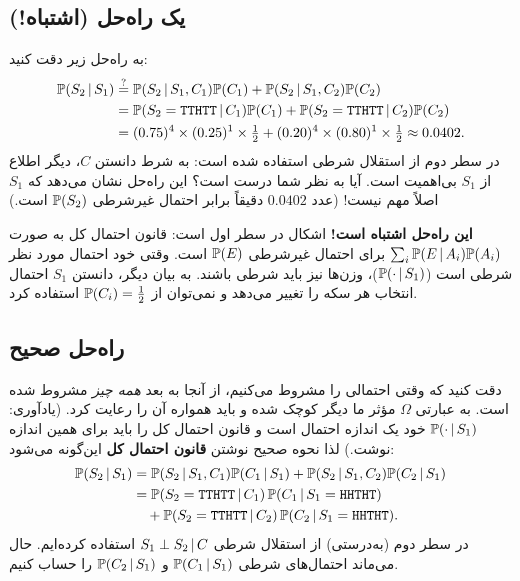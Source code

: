\subsection{یک راه‌حل (اشتباه!)}
به راه‌حل زیر دقت کنید:
\begin{align*}
\mathbb{P}(S_2\,|\, S_1)&\overset{?}{=}\mathbb{P}(S_2\,|\, S_1,C_1)\mathbb{P}(C_1)+\mathbb{P}(S_2\,|\, S_1,C_2)\mathbb{P}(C_2)\\
&=\mathbb{P}(S_2=\mathtt{TTHTT}\,|\, C_1)\mathbb{P}(C_1)+\mathbb{P}(S_2=\mathtt{TTHTT}\,|\, C_2)\mathbb{P}(C_2)\\
&=(0.75)^4\times(0.25)^1\times\tfrac12+(0.20)^4\times(0.80)^1\times\tfrac12\approx0.0402 .
\end{align*}
در سطر دوم از استقلال شرطی استفاده شده است: به شرط دانستن $C$، دیگر اطلاع از $S_1$ بی‌اهمیت است. آیا به نظر شما درست است؟ این راه‌حل نشان می‌دهد که $S_1$ اصلاً مهم نیست! (عدد $0.0402$ دقیقاً برابر احتمال غیرشرطی $\mathbb{P}(S_2)$ است.)

\begin{warning}
\warntitle \textbf{این راه‌حل اشتباه است!} اشکال در سطر اول است: قانون احتمال کل به صورت $\sum_i\mathbb{P}(E\,|\, A_i)\mathbb{P}(A_i)$ برای احتمال غیرشرطی $\mathbb{P}(E)$ است. وقتی خود احتمال مورد نظر شرطی است ($\mathbb{P}(\cdot\,|\, S_1)$)، وزن‌ها نیز باید شرطی باشند. به بیان دیگر، دانستن $S_1$ احتمال انتخاب هر سکه را تغییر می‌دهد و نمی‌توان از $\mathbb{P}(C_i)=\frac12$ استفاده کرد.
\end{warning}

\subsection{راه‌حل صحیح}
دقت کنید که وقتی احتمالی را مشروط می‌کنیم، از آنجا به بعد \emph{همه چیز} مشروط شده است. به عبارتی $\Omega$ مؤثر ما دیگر کوچک شده و باید همواره آن را رعایت کرد. (یادآوری: $\mathbb{P}(\cdot\,|\, S_1)$ خود یک اندازه احتمال است و قانون احتمال کل را باید برای همین اندازه نوشت.) لذا نحوه صحیح نوشتن \textbf{قانون احتمال کل} این‌گونه می‌شود:
\begin{align*}
\mathbb{P}(S_2\,|\, S_1)&=\mathbb{P}(S_2\,|\, S_1,C_1)\mathbb{P}(C_1\,|\, S_1)+\mathbb{P}(S_2\,|\, S_1,C_2)\mathbb{P}(C_2\,|\, S_1)\\
&=\mathbb{P}(S_2=\mathtt{TTHTT}\,|\, C_1)\,\mathbb{P}(C_1\,|\, S_1=\mathtt{HHTHT})\\
&\quad+\mathbb{P}(S_2=\mathtt{TTHTT}\,|\, C_2)\,\mathbb{P}(C_2\,|\, S_1=\mathtt{HHTHT}).
\end{align*}
در سطر دوم (به‌درستی) از استقلال شرطی $S_1\perp S_2\,|\, C$ استفاده کرده‌ایم. حال می‌ماند احتمال‌های شرطی $\mathbb{P}(C_1\,|\, S_1)$ و $\mathbb{P}(C_2\,|\, S_1)$ را حساب کنیم.

